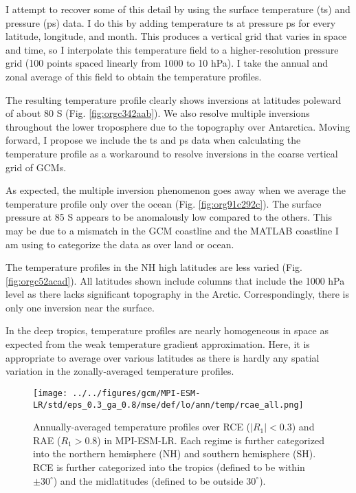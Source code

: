 \documentclass[11pt]{article}
\begin{document}
I attempt to recover some of this detail by using the surface temperature (ts) and pressure (ps) data. I do this by adding temperature ts at pressure ps for every latitude, longitude, and month. This produces a vertical grid that varies in space and time, so I interpolate this temperature field to a higher-resolution pressure grid (100 points spaced linearly from 1000 to 10 hPa). I take the annual and zonal average of this field to obtain the temperature profiles.

The resulting temperature profile clearly shows inversions at latitudes poleward of about 80 S (Fig. \ref{fig:orgc342aab}). We also resolve multiple inversions throughout the lower troposphere due to the topography over Antarctica. Moving forward, I propose we include the ts and ps data when calculating the temperature profile as a workaround to resolve inversions in the coarse vertical grid of GCMs.

As expected, the multiple inversion phenomenon goes away when we average the temperature profile only over the ocean (Fig. \ref{fig:org91c292c}). The surface pressure at 85 S appears to be anomalously low compared to the others. This may be due to a mismatch in the GCM coastline and the MATLAB coastline I am using to categorize the data as over land or ocean.

The temperature profiles in the NH high latitudes are less varied (Fig. \ref{fig:orgc52acad}). All latitudes shown include columns that include the 1000 hPa level as there lacks significant topography in the Arctic. Correspondingly, there is only one inversion near the surface.

In the deep tropics, temperature profiles are nearly homogeneous in space as expected from the weak temperature gradient approximation. Here, it is appropriate to average over various latitudes as there is hardly any spatial variation in the zonally-averaged temperature profiles.

\begin{figure}[htbp]
\centering
\texttt{[image: ../../figures/gcm/MPI-ESM-LR/std/eps\_0.3\_ga\_0.8/mse/def/lo/ann/temp/rcae\_all.png]}
\caption{\label{fig:org865427b}Annually-averaged temperature profiles over RCE (\(|R_1|<0.3\)) and RAE (\(R_1>0.8\)) in MPI-ESM-LR. Each regime is further categorized into the northern hemisphere (NH) and southern hemisphere (SH). RCE is further categorized into the tropics (defined to be within \(\pm 30^\circ\)) and the midlatitudes (defined to be outside \(30^\circ\)).}
\end{figure}
\end{document}
